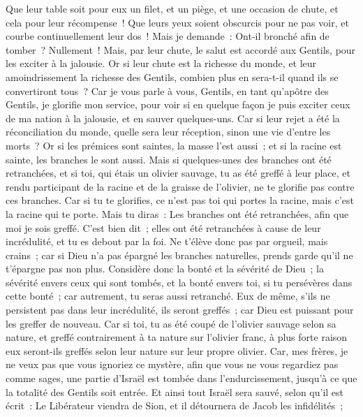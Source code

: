 \begin{multicols}{2}
Que leur table soit pour eux un filet, et un piège, et une occasion de chute, et cela pour leur récompense~!
Que leurs yeux soient obscurcis pour ne pas voir, et courbe continuellement leur dos~!
Mais je demande~: Ont-il bronché afin de tomber~? Nullement~! Mais, par leur chute, le salut est accordé aux Gentils, pour les exciter à la jalousie.
Or si leur chute est la richesse du monde, et leur amoindrissement la richesse des Gentils, combien plus en sera-t-il quand ils se convertiront tous~?
Car je vous parle à vous, Gentils, en tant qu'apôtre des Gentils, je glorifie mon service,
pour voir si en quelque façon je puis exciter ceux de ma nation à la jalousie, et en sauver quelques-uns.
Car si leur rejet a été la réconciliation du monde, quelle sera leur réception, sinon une vie d'entre les morts~?
Or si les prémices sont saintes, la masse l'est aussi~; et si la racine est sainte, les branches le sont aussi.
Mais si quelques-unes des branches ont été retranchées, et si toi, qui étais un olivier sauvage, tu as été greffé à leur place, et rendu participant de la racine et de la graisse de l'olivier,
ne te glorifie pas contre ces branches. Car si tu te glorifies, ce n'est pas toi qui portes la racine, mais c'est la racine qui te porte.
Mais tu diras~: Les branches ont été retranchées, afin que moi je sois greffé.
C'est bien dit~; elles ont été retranchées à cause de leur incrédulité, et tu es debout par la foi. Ne t'élève donc pas par orgueil, mais crains~;
car si Dieu n'a pas épargné les branches naturelles, prends garde qu'il ne t'épargne pas non plus.
Considère donc la bonté et la sévérité de Dieu~; la sévérité envers ceux qui sont tombés, et la bonté envers toi, si tu persévères dans cette bonté~; car autrement, tu seras aussi retranché.
Eux de même, s'ils ne persistent pas dans leur incrédulité, ils seront greffés~; car Dieu est puissant pour les greffer de nouveau.
Car si toi, tu as été coupé de l'olivier sauvage selon sa nature, et greffé contrairement à ta nature sur l'olivier franc, à plus forte raison eux seront-ils greffés selon leur nature sur leur propre olivier.
Car, mes frères, je ne veux pas que vous ignoriez ce mystère, afin que vous ne vous regardiez pas comme sages, une partie d'Israël est tombée dans l'endurcissement, jusqu'à ce que la totalité des Gentils soit entrée.
Et ainsi tout Israël sera sauvé, selon qu'il est écrit~: Le Libérateur viendra de Sion, et il détournera de Jacob les infidélités~;

\end{multicols}
